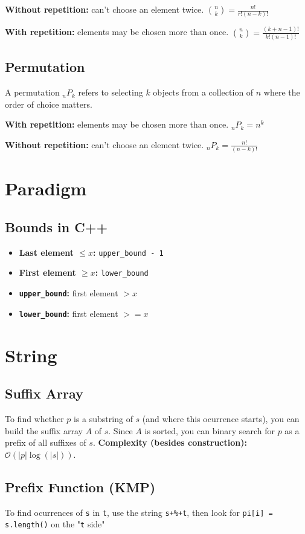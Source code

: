 \documentclass[a4paper]{article}
\begin{document}
\textbf{Without repetition:} can't choose an element twice. $\binom{n}{k} = \frac{n!}{r!(n-k)!}$

\textbf{With repetition:} elements may be chosen more than once. $\binom{n}{k} = \frac{(k+n-1)!}{k!(n-1)!}$

\subsection{Permutation}
A permutation ${}_nP_k$ refers to selecting $k$ objects from a collection of $n$ where the order of choice matters.

\textbf{With repetition:} elements may be chosen more than once. ${}_nP_k = n^k$

\textbf{Without repetition:} can't choose an element twice. ${}_nP_k = \frac{n!}{(n-k)!}$

\section{Paradigm}
\subsection{Bounds in C++}
\begin{itemize}
  \item \textbf{Last element $\leq x$:} \texttt{upper\_bound - 1}
  \item \textbf{First element $\geq x$:} \texttt{lower\_bound}
  \item \textbf{\texttt{upper\_bound}:} first element $> x$
  \item \textbf{\texttt{lower\_bound}:} first element $>= x$
\end{itemize}

\section{String}
\subsection{Suffix Array}
To find whether $p$ is a substring of $s$ (and where this ocurrence starts), you can build the suffix array $A$ of $s$. Since $A$ is sorted, you can binary search for $p$ as a prefix of all suffixes of $s$. \textbf{Complexity (besides construction):} $\mathcal{O}(\left|p\right|\log(\left|s\right|))$.

\subsection{Prefix Function (KMP)}
To find ocurrences of \texttt{s} in \texttt{t}, use the string \texttt{s+\%+t}, then look for \texttt{pi[i] = s.length()} on the "\texttt{t} side"
\end{document}
